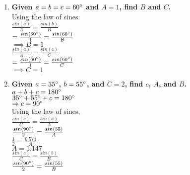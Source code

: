 \begin{enumerate}

\item{\bf Given $a=b=c=60^\circ$ and $A=1$, find $B$ and $C$.}\\

\tab \tab Using the law of sines:\\

\tab \tab $\frac{sin(a)}{A} = \frac{sin(b)}{B}$\\

\tab \tab $=\frac{sin(60^\circ)}{1} = \frac{sin(60^\circ)}{B}$\\

\tab \tab $\implies B = 1$\\

\tab \tab $\frac{sin(a)}{A} = \frac{sin(c)}{C}$\\

\tab \tab $=\frac{sin(60^\circ)}{1} = \frac{sin(60^\circ)}{C}$\\

\tab \tab $\implies C = 1$\\

\item{\bf Given $a=35^\circ$, $b=55^\circ$, and $C=2$, find $c$, $A$, and $B$.}\\

\tab \tab $a+b+c=180^\circ$\\

\tab \tab $35^\circ + 55^\circ + c = 180^\circ$\\

\tab \tab $\Rightarrow c = 90^\circ$\\

\tab \tab Using the law of sines,\\

\tab \tab $\frac{sin(c)}{C} = \frac{sin(a)}{A}$\\

\tab \tab $\frac{sin(90^\circ)}{2} = \frac{sin(35)}{A}$\\

\tab \tab $\frac{1}{2} = \frac{0.574}{A}$\\

\tab \tab $A = 1.147$\\

\tab \tab $\frac{sin(c)}{C} = \frac{sin(b)}{B}$\\

\tab \tab $\frac{sin(90^\circ)}{2} = \frac{sin(55)}{B}$\\


\end{enumerate}

